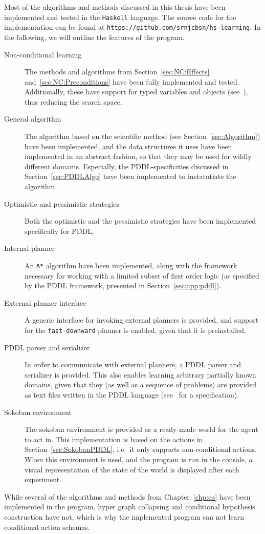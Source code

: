 \documentclass[../Master.tex]{subfiles}
\begin{document}
Most of the algorithms and methods discussed in this thesis have been implemented and tested in the \texttt{Haskell} language. The source code for the implementation can be found at \texttt{https://github.com/srnjcbsn/hs-learning}. In the following, we will outline the features of the program.

\begin{description}
    \item[Non-conditional learning] 
        The methods and algorithms from Section~\ref{sec:NC:Effects} and~\ref{sec:NC:Preconditions} have been fully implemented and tested. Additionally, these have support for typed variables and objects (see~\cite{PDDL}), thus reducing the search space.
    \item[General algorithm]
        The algorithm based on the scientific method (see Section~\ref{sec:Algorithm}) have been implemented, and the data structures it uses have been implemented in an abstract fashion, so that they may be used for wildly different domains. Especially, the PDDL-specificities discussed in Section~\ref{sec:PDDLAlgo} have been implemented to instatntiate the algorithm.
    \item[Optimistic and pessimistic strategies]
        Both the optimistic and the pessimistic strategies have been implemented specifically for PDDL.
    \item[Internal planner] An \texttt{A*} algorithm have been implemented, along with the framework necessary for working with a limited subset of first order logic (as specified by the PDDL framework, presented in Section~\ref{sec:app:pddl}).
    \item[External planner interface] A generic interface for invoking external planners is provided, and support for the \texttt{fast-downward} planner is enabled, given that it is preinstalled.
    \item[PDDL parser and serializer]
        In order to communicate with external planners, a PDDL parser and serializer is provided. This also enables learning arbitrary partially known domains, given that they (as well as a sequence of problems) are provided as text files written in the PDDL language (see~\cite{PDDL} for a specification).
    \item[Sokoban environment]
        The sokoban environment is provided as a ready-made world for the agent to act in. This implementation is based on the actions in Section~\ref{sec:SokobanPDDL}, i.e.\ it only supports non-conditional actions. When this environment is used, and the program is run in the console, a visual representation of the state of the world is displayed after each experiment.
\end{description}

While several of the algorithms and methods from Chapter~\ref{chp:ca} have been implemented in the program, hyper graph collapsing and conditional hypothesis construction have not, which is why the implemented program can not learn conditional action schemas.
\end{document}
